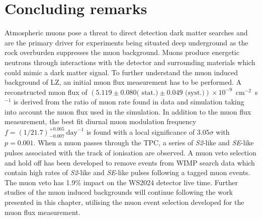 \pagebreak

\section{Concluding remarks}
Atmospheric muons pose a threat to direct detection dark matter searches and are the primary driver for experiments being situated deep underground as the rock overburden suppresses the muon background. Muons produce energetic neutrons through interactions with the detector and surrounding materials which could mimic a dark matter signal. To further understand the muon induced background of LZ, an initial muon flux measurement has to be performed. A reconstructed muon flux of $(5.119 \pm 0.080 \textrm{( stat.)} \pm 0.049 \textrm{ (syst.)})\times10^{-9}$~cm$^{-2}$~s$^{-1}$ is derived from the ratio of muon rate found in data and simulation taking into account the muon flux used in the simulation. In addition to the muon flux measurement, the best fit diurnal muon modulation frequency $f=(1/21.7)^{+0.005}_{-0.007}~\text{day}^{-1}$ is found with a local significance of $3.05\sigma$ with $p=0.001$. When a muon passes through the TPC, a series of \textit{S2}-like and \textit{SE}-like pulses associated with the track of ionisation are observed. A muon veto selection and hold off has been developed to remove events from WIMP search data which contain high rates of \textit{S2}-like and \textit{SE}-like pulses following a tagged muon events. The muon veto has 1.9\% impact on the WS2024 detector live time. Further studies of the muon induced backgrounds will continue following the work presented in this chapter, utilising the muon event selection developed for the muon flux measurement.